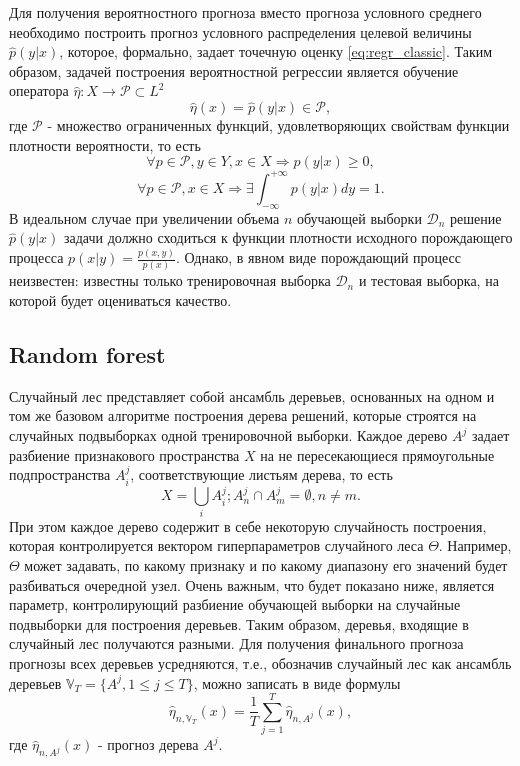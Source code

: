 \documentclass[fleqn,usenatbib]{mnras}
\begin{document}
Для получения вероятностного прогноза вместо прогноза условного среднего необходимо построить прогноз условного распределения целевой величины \(\hat{p}(y|x)\), которое, формально, задает точечную оценку \eqref{eq:regr_classic}. Таким образом, задачей построения вероятностной регрессии является обучение оператора \(\hat{\eta} : X \rightarrow \mathcal{P} \subset L^2\)
\begin{equation}
    \hat{\eta}(x) = \hat{p}(y|x) \in \mathcal{P},
\end{equation}
где \(\mathcal{P}\) - множество ограниченных функций, удовлетворяющих свойствам функции плотности вероятности, то есть
\begin{equation}
    \forall p \in \mathcal{P}, y \in Y, x \in X \Rightarrow p(y|x) \geq 0,
\end{equation}
\begin{equation}
    \forall p \in \mathcal{P}, x \in X \Rightarrow \exists \int_{-\infty}^{+\infty} p(y|x) dy = 1.
\end{equation}
В идеальном случае при увеличении объема \(n\) обучающей выборки \(\mathcal{D}_n\) решение \(\hat{p}(y|x)\) задачи должно сходиться к функции плотности исходного порождающего процесса \(p(x|y) = \frac{p(x,y)}{p(x)}\). Однако, в явном виде порождающий процесс неизвестен: известны только тренировочная выборка \(\mathcal{D}_n\) и тестовая выборка, на которой будет оцениваться качество.

\subsection{Random forest}

Случайный лес \cite{bib:forests_brieman} представляет собой ансамбль деревьев, основанных на одном и том же базовом алгоритме построения дерева решений, которые строятся на случайных подвыборках одной тренировочной выборки. Каждое дерево \(A^j\) задает разбиение признакового пространства \(X\) на не пересекающиеся прямоугольные подпространства \(A^j_i\), соответствующие листьям дерева, то есть
\begin{equation}
    X = \bigcup_i {A^j_i}; A^j_n \cap A^j_m = \emptyset, n \neq m.
\end{equation}
При этом каждое дерево содержит в себе некоторую случайность построения, которая контролируется вектором гиперпараметров случайного леса \(\Theta\). Например, \(\Theta\) может задавать, по какому признаку и по какому диапазону его значений будет разбиваться очередной узел. Очень важным, что будет показано ниже, является параметр, контролирующий разбиение обучающей выборки на случайные подвыборки для построения деревьев. Таким образом, деревья, входящие в случайный лес получаются разными. Для получения финального прогноза прогнозы всех деревьев усредняются, т.е., обозначив случайный лес как ансамбль деревьев \(\mathbb{V}_T = \{A^j, 1 \leq j \leq T\}\), можно записать в виде формулы
\begin{equation}
    \hat{\eta}_{n, \mathbb{V}_T}(x) = \frac{1}{T} \sum_{j=1}^T \hat\eta_{n, A^j}(x),
\end{equation}
где \(\hat\eta_{n, A^j}(x)\) - прогноз дерева \(A^j\).
\end{document}
